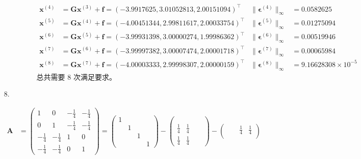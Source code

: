 \documentclass{sjtuarticle}
\begin{document}
\begin{itemize}
\begin{solution}
\begin{itemize}
\begin{description}
\begin{align*}
\bm{x}^{(4)}&=\bm{G}\bm{x}^{(3)}+\bm{f}=\left(-3.9917625, 3.01052813, 2.00151094\right)^\top & \lVert\bm{\epsilon}^{(4)}\rVert_{\infty}&=0.0582625 \\
\bm{x}^{(5)}&=\bm{G}\bm{x}^{(4)}+\bm{f}=\left(-4.00451344, 2.99811617, 2.00033754\right)^\top & \lVert\bm{\epsilon}^{(5)}\rVert_{\infty}&=0.01275094 \\
\bm{x}^{(6)}&=\bm{G}\bm{x}^{(5)}+\bm{f}=\left(-3.99931398, 3.00000274, 1.99986362\right)^\top & \lVert\bm{\epsilon}^{(6)}\rVert_{\infty}&=0.00519946 \\
\bm{x}^{(7)}&=\bm{G}\bm{x}^{(6)}+\bm{f}=\left(-3.99997382, 3.00007474, 2.00001718\right)^\top & \lVert\bm{\epsilon}^{(7)}\rVert_{\infty}&=0.00065984 \\
\bm{x}^{(8)}&=\bm{G}\bm{x}^{(7)}+\bm{f}=\left(-4.00003333, 2.99998307, 2.00000159\right)^\top & \lVert\bm{\epsilon}^{(8)}\rVert_{\infty}&=9.16628308\times 10^{-5}
        \end{align*}
        总共需要 8 次满足要求。
    \end{description}
    \end{itemize}
    \end{solution}
    \item[8.]\begin{solution}
        \begin{align*}
            \bm{A}&=\begin{pmatrix}
                1 & 0 & -\frac14 & -\frac14 \\
                0 & 1 & -\frac14 & -\frac14 \\
                -\frac14 & -\frac14 & 1 & 0 \\
                -\frac14 & -\frac14 & 0 & 1
            \end{pmatrix}=\begin{pmatrix}
                1\\
                &1\\
                &&1\\
                &&&1
            \end{pmatrix}-\begin{pmatrix}
                \\
                \\
                \frac14 & \frac14 \\
                \frac14 & \frac14 & &
            \end{pmatrix}-\begin{pmatrix}
                &&\frac14 & \frac14 \\

\end{pmatrix}
\end{align*}
\end{solution}
\end{itemize}
\end{document}
